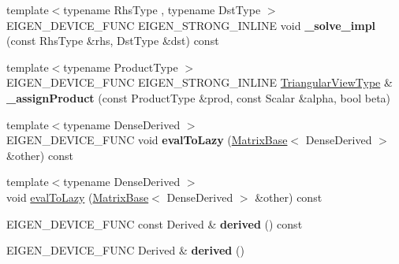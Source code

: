 \begin{DoxyCompactItemize}
\item 
\mbox{\label{class_eigen_1_1_triangular_view_impl_3_01___matrix_type_00_01___mode_00_01_dense_01_4_a77e884978c6495cffed68007fb603114}} 
{\footnotesize template$<$typename Rhs\+Type , typename Dst\+Type $>$ }\\E\+I\+G\+E\+N\+\_\+\+D\+E\+V\+I\+C\+E\+\_\+\+F\+U\+NC E\+I\+G\+E\+N\+\_\+\+S\+T\+R\+O\+N\+G\+\_\+\+I\+N\+L\+I\+NE void {\bfseries \+\_\+solve\+\_\+impl} (const Rhs\+Type \&rhs, Dst\+Type \&dst) const
\item 
\mbox{\label{class_eigen_1_1_triangular_view_impl_3_01___matrix_type_00_01___mode_00_01_dense_01_4_af6fe82daa7690c57f0a31c48800120af}} 
{\footnotesize template$<$typename Product\+Type $>$ }\\E\+I\+G\+E\+N\+\_\+\+D\+E\+V\+I\+C\+E\+\_\+\+F\+U\+NC E\+I\+G\+E\+N\+\_\+\+S\+T\+R\+O\+N\+G\+\_\+\+I\+N\+L\+I\+NE \mbox{\hyperlink{class_eigen_1_1_triangular_view}{Triangular\+View\+Type}} \& {\bfseries \+\_\+assign\+Product} (const Product\+Type \&prod, const Scalar \&alpha, bool beta)
\item 
\mbox{\label{class_eigen_1_1_triangular_view_impl_3_01___matrix_type_00_01___mode_00_01_dense_01_4_ad05367709c25defe72371a9fa83b9697}} 
{\footnotesize template$<$typename Dense\+Derived $>$ }\\E\+I\+G\+E\+N\+\_\+\+D\+E\+V\+I\+C\+E\+\_\+\+F\+U\+NC void {\bfseries eval\+To\+Lazy} (\mbox{\hyperlink{class_eigen_1_1_matrix_base}{Matrix\+Base}}$<$ Dense\+Derived $>$ \&other) const
\item 
{\footnotesize template$<$typename Dense\+Derived $>$ }\\void \mbox{\hyperlink{class_eigen_1_1_triangular_view_impl_3_01___matrix_type_00_01___mode_00_01_dense_01_4_ab8db3e55eee50cdc56650b3498e235eb}{eval\+To\+Lazy}} (\mbox{\hyperlink{class_eigen_1_1_matrix_base}{Matrix\+Base}}$<$ Dense\+Derived $>$ \&other) const
\item 
\mbox{\label{class_eigen_1_1_triangular_view_impl_3_01___matrix_type_00_01___mode_00_01_dense_01_4_a0bde7bb684256ff85527f5cf606f3de8}} 
E\+I\+G\+E\+N\+\_\+\+D\+E\+V\+I\+C\+E\+\_\+\+F\+U\+NC const Derived \& {\bfseries derived} () const
\item 
\mbox{\label{class_eigen_1_1_triangular_view_impl_3_01___matrix_type_00_01___mode_00_01_dense_01_4_ac5f8c093e6639aed751c81e1bcac8504}} 
E\+I\+G\+E\+N\+\_\+\+D\+E\+V\+I\+C\+E\+\_\+\+F\+U\+NC Derived \& {\bfseries derived} ()
\end{DoxyCompactItemize}
